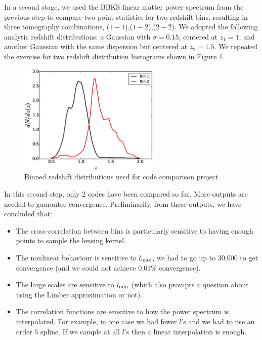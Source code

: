 \documentclass[\docopts]{\docclass}
\begin{document}
In a second stage, we used the BBKS linear matter power spectrum from the previous step to compare two-point statistics for two redshift bins, resulting in three tomography combinations, ($1-1$),($1-2$),($2-2$). We adopted the following analytic redshift distributions: a Gaussian with $\sigma = 0.15$, centered at $z_1 = 1$; and another Gaussian with the same dispersion but centered at $z_2 = 1.5$. We repeated the exercise for two redshift distribution histograms shown in Figure \ref{fig:zhistos}. 

\begin{figure}
\centering
\includegraphics[width=0.6\textwidth]{zdist.eps}
\caption{Binned redshift distributions used for code comparison project.}
\label{fig:zhistos}
\end{figure}

In this second step, only 2 codes have been compared so far. More outputs are needed to guarantee convergence. Preliminarily, from these outputs, we have concluded that:
\begin{itemize}
\item The cross-correlation between bins is particularly sensitive to having enough points to sample the lensing kernel. 
\item The nonlinear behaviour is sensitive to $l_{\rm max}$, we had to go up to 30,000 to get convergence (and we could not achieve $0.01\%$ convergence).
\item The large scales are sensitive to $l_{\rm min}$ (which also prompts a question about using the Limber approximation or not).
\item The correlation functions are sensitive to how the power spectrum is interpolated. For example, in one case we had fewer $l$'s and we had to use an order $5$ spline. If we sample at all $l$'s then a linear interpolation is enough.
\end{itemize}
\end{document}
